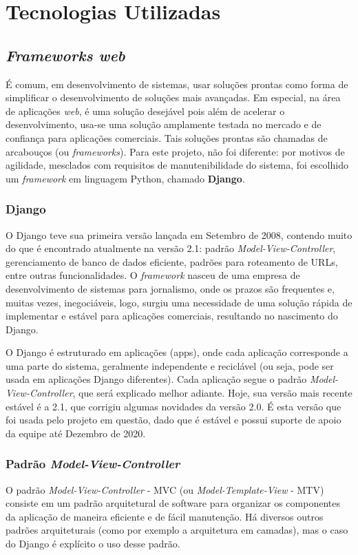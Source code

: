 \chapter{Tecnologias Utilizadas}
\section{\textit{Frameworks web}}

É comum, em desenvolvimento de sistemas, usar soluções prontas como forma de simplificar o desenvolvimento de soluções mais avançadas. Em especial, na área de aplicações \textit{web}, é uma solução desejável pois além de acelerar o desenvolvimento, usa-se uma solução amplamente testada no mercado e de confiança para aplicações comerciais. Tais soluções prontas são chamadas de arcabouços (ou \textit{frameworks}). Para este projeto, não foi diferente: por motivos de agilidade, mesclados com requisitos de manutenibilidade do sistema, foi escolhido um \textit{framework} em linguagem Python, chamado \textbf{Django}.

\subsection{Django}
O Django teve sua primeira versão lançada em Setembro de 2008\cite{djangowikispaces2012}, contendo muito do que é encontrado atualmente na versão 2.1\cite{djangodocs}: padrão \textit{Model-View-Controller}, gerenciamento de banco de dados eficiente, padrões para roteamento de URLs, entre outras funcionalidades. O \textit{framework} nasceu de uma empresa de desenvolvimento de sistemas para jornalismo, onde os prazos são frequentes e, muitas vezes, inegociáveis, logo, surgiu uma necessidade de uma solução rápida de implementar e estável para aplicações comerciais, resultando no nascimento do Django\cite{djangogeneral2018}.

O Django é estruturado em aplicações (apps), onde cada aplicação corresponde a uma parte do sistema, geralmente independente e reciclável (ou seja, pode ser usada em aplicações Django diferentes). Cada aplicação segue o padrão \textit{Model-View-Controller}, que será explicado melhor adiante\cite{djangodocs}. Hoje, sua versão mais recente estável é a 2.1, que corrigiu algumas novidades da versão 2.0. É esta versão que foi usada pelo projeto em questão, dado que é estável e possui suporte de apoio da equipe até Dezembro de 2020\cite{djangodownload}.

\subsection{Padrão \textit{Model-View-Controller}}
O padrão \textit{Model-View-Controller} - MVC (ou \textit{Model-Template-View} - MTV) consiste em um padrão arquitetural de software para organizar os componentes da aplicação de maneira eficiente e de fácil manutenção. Há diversos outros padrões arquiteturais (como por exemplo a arquitetura em camadas), mas o caso do Django é explícito o uso desse padrão.

